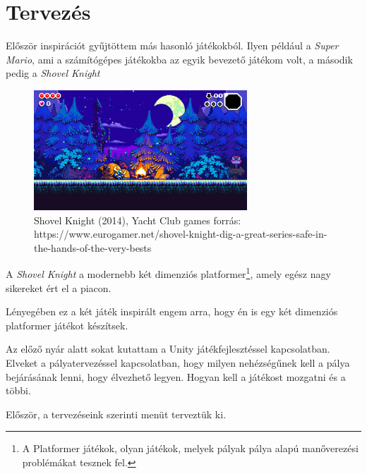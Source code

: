 \documentclass[]{thesis-ekf}
\theoremstyle{definition}
\begin{document}
	\section{Tervezés}
	Először inspirációt gyűjtöttem más hasonló játékokból. Ilyen például a \emph{Super Mario}, ami a számítógépes játékokba az egyik bevezető játékom volt, a második pedig a \emph{Shovel Knight} 
	
	\begin{figure}[!ht]
		\label{kep:shovelknight}
		\centering
		\includegraphics[width=8cm]{shovelknight}
		\caption{Shovel Knight (2014), Yacht Club games forrás: https://www.eurogamer.net/shovel-knight-dig-a-great-series-safe-in-the-hands-of-the-very-bests}
	\end{figure}

	A \emph{Shovel Knight} a modernebb két dimenziós platformer\footnote{A Platformer játékok, olyan játékok, melyek pályak pálya alapú manőverezési problémákat tesznek fel.}, amely egész nagy sikereket ért el a piacon.
	
	Lényegében ez a két játék inspirált engem arra, hogy én is egy két dimenziós platformer játékot készítsek.
	
	Az előző nyár alatt sokat kutattam a Unity játékfejlesztéssel kapcsolatban. Elveket a pályatervezéssel kapcsolatban, hogy milyen nehézségűnek kell a pálya bejárásának lenni, hogy élvezhető legyen.
	Hogyan kell a játékost mozgatni és a többi.
	
	
	Először, a tervezéseink szerinti menüt terveztük ki.
	
\end{document}
